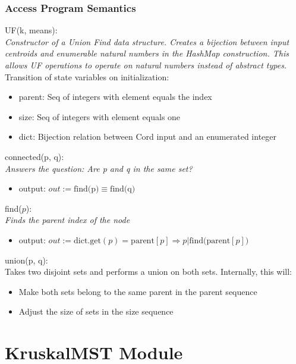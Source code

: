 \documentclass[12pt]{article}
\begin{document}
\subsubsection* {Access Program Semantics}

UF(k, means):\\
\textit{Constructor of a Union Find data structure. Creates a bijection between
input centroids and enumerable natural numbers in the HashMap construction. This
allows UF operations to operate on natural numbers instead of abstract types. }\\
\noindent
Transition of state variables on initialization:
\begin{itemize}
\item parent: Seq of integers with element equals the index
\item size: Seq of integers with element equals one
\item dict: Bijection relation between Cord input and an enumerated integer
\end{itemize}

\noindent
connected(p, q):\\
\textit{Answers the question: Are p and q in the same set?}
\begin{itemize}
\item output: $out := \mbox{find(p)} \equiv \mbox{find(q)}$
\end{itemize}

\noindent
find($p$):\\
\textit{Finds the parent index of the node}
\begin{itemize}
\item output: $out := \mbox{dict.get}(p) = \mbox{parent}[p] \Rightarrow p | \mbox{find(parent}[p])$
\end{itemize}

\noindent
union(p, q):\\
Takes two disjoint sets and performs a union on both sets. Internally, this will:
\begin{itemize}
\item Make both sets belong to the same parent in the parent sequence
\item Adjust the size of sets in the size sequence
\end{itemize}

\newpage


\section*{KruskalMST Module}
\end{document}
